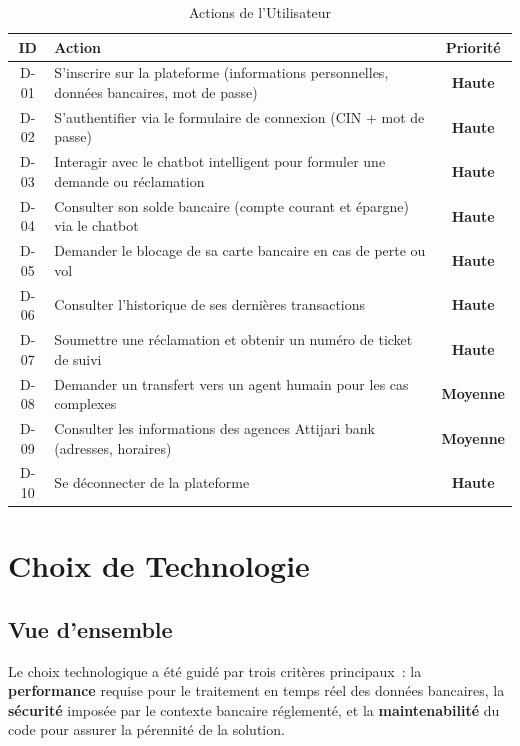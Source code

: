 \documentclass[12pt,a4paper]{report}
\newcommand{\high}{\textcolor{redAlert}{\textbf{Haute}}}
\newcommand{\medium}{\textcolor{attijariOrange}{\textbf{Moyenne}}}
\begin{document}
\begin{table}[H]
\centering
\caption{Actions de l'Utilisateur}
\begin{tabularx}{\textwidth}{|c|X|c|}
\hline
\textbf{ID} & \textbf{Action} & \textbf{Priorité} \\
\hline
D-01 & S'inscrire sur la plateforme (informations personnelles, données bancaires, mot de passe) & \high \\
\hline
D-02 & S'authentifier via le formulaire de connexion (CIN + mot de passe) & \high \\
\hline
D-03 & Interagir avec le chatbot intelligent pour formuler une demande ou réclamation & \high \\
\hline
D-04 & Consulter son solde bancaire (compte courant et épargne) via le chatbot & \high \\
\hline
D-05 & Demander le blocage de sa carte bancaire en cas de perte ou vol & \high \\
\hline
D-06 & Consulter l'historique de ses dernières transactions & \high \\
\hline
D-07 & Soumettre une réclamation et obtenir un numéro de ticket de suivi & \high \\
\hline
D-08 & Demander un transfert vers un agent humain pour les cas complexes & \medium \\
\hline
D-09 & Consulter les informations des agences Attijari bank (adresses, horaires) & \medium \\
\hline
D-10 & Se déconnecter de la plateforme & \high \\
\hline
\end{tabularx}
\end{table}


\chapter{Choix de Technologie}

\section{Vue d'ensemble}

Le choix technologique a été guidé par trois critères principaux~: la \textbf{performance} requise pour le traitement en temps réel des données bancaires, la \textbf{sécurité} imposée par le contexte bancaire réglementé, et la \textbf{maintenabilité} du code pour assurer la pérennité de la solution.
\end{document}
